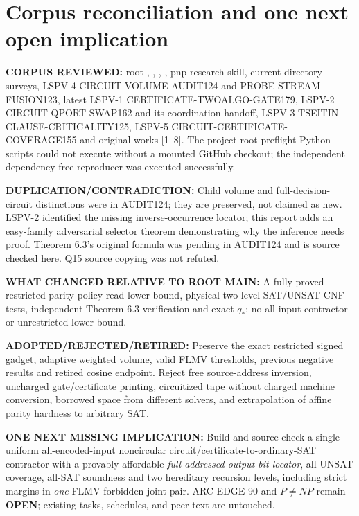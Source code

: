 \documentclass[11pt]{article}
\begin{document}
\section{Corpus reconciliation and one next open implication}
\textbf{CORPUS REVIEWED:} root , , , , pnp-research skill, current directory surveys, LSPV-4 CIRCUIT-VOLUME-AUDIT124 and PROBE-STREAM-FUSION123, latest LSPV-1 CERTIFICATE-TWOALGO-GATE179, LSPV-2 CIRCUIT-QPORT-SWAP162 and its coordination handoff, LSPV-3 TSEITIN-CLAUSE-CRITICALITY125, LSPV-5 CIRCUIT-CERTIFICATE-COVERAGE155 and original works [1--8]. The project root preflight Python scripts could not execute without a mounted GitHub checkout; the independent dependency-free reproducer was executed successfully.
\par\textbf{DUPLICATION/CONTRADICTION:} Child volume and full-decision-circuit distinctions were in AUDIT124; they are preserved, not claimed as new. LSPV-2 identified the missing inverse-occurrence locator; this report adds an easy-family adversarial selector theorem demonstrating why the inference needs proof. Theorem 6.3's original formula was pending in AUDIT124 and is source checked here. Q15 source copying was not refuted.
\par\textbf{WHAT CHANGED RELATIVE TO ROOT MAIN:} A fully proved restricted parity-policy read lower bound, physical two-level SAT/UNSAT CNF tests, independent Theorem 6.3 verification and exact $q_*$; no all-input contractor or unrestricted lower bound.
\par\textbf{ADOPTED/REJECTED/RETIRED:} Preserve the exact restricted signed gadget, adaptive weighted volume, valid FLMV thresholds, previous negative results and retired cosine endpoint. Reject free source-address inversion, uncharged gate/certificate printing, circuitized tape without charged machine conversion, borrowed space from different solvers, and extrapolation of affine parity hardness to arbitrary SAT.
\par\textbf{ONE NEXT MISSING IMPLICATION:} Build and source-check a single uniform all-encoded-input noncircular circuit/certificate-to-ordinary-SAT contractor with a provably affordable \emph{full addressed output-bit locator}, all-UNSAT coverage, all-SAT soundness and two hereditary recursion levels, including strict margins in \emph{one} FLMV forbidden joint pair. ARC-EDGE-90 and $P\ne NP$ remain \textbf{OPEN}; existing tasks, schedules, and peer text are untouched.
\end{document}
